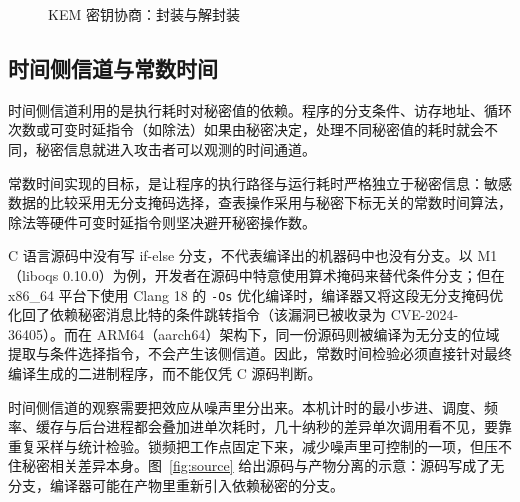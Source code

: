 \begin{figure}[htbp]
\centering
{}
\caption{KEM 密钥协商：封装与解封装}
\label{fig:kem}
\end{figure}

\subsection{时间侧信道与常数时间}

时间侧信道利用的是执行耗时对秘密值的依赖。程序的分支条件、访存地址、循环次数或可变时延指令（如除法）如果由秘密决定，处理不同秘密值的耗时就会不同，秘密信息就进入攻击者可以观测的时间通道。

常数时间实现的目标，是让程序的执行路径与运行耗时严格独立于秘密信息：敏感数据的比较采用无分支掩码选择，查表操作采用与秘密下标无关的常数时间算法，除法等硬件可变时延指令则坚决避开秘密操作数。

C 语言源码中没有写 if-else 分支，不代表编译出的机器码中也没有分支。以 M1（liboqs 0.10.0）为例，开发者在源码中特意使用算术掩码来替代条件分支；但在 x86\_64 平台下使用 Clang 18 的 \texttt{-Os} 优化编译时，编译器又将这段无分支掩码优化回了依赖秘密消息比特的条件跳转指令（该漏洞已被收录为 CVE-2024-36405\cite{ghsa-f2v9}）。而在 ARM64（aarch64）架构下，同一份源码则被编译为无分支的位域提取与条件选择指令，不会产生该侧信道。因此，常数时间检验必须直接针对最终编译生成的二进制程序，而不能仅凭 C 源码判断。

时间侧信道的观察需要把效应从噪声里分出来。本机计时的最小步进、调度、频率、缓存与后台进程都会叠加进单次耗时，几十纳秒的差异单次调用看不见，要靠重复采样与统计检验。锁频把工作点固定下来，减少噪声里可控制的一项，但压不住秘密相关差异本身。图~\ref{fig:source} 给出源码与产物分离的示意：源码写成了无分支，编译器可能在产物里重新引入依赖秘密的分支。

